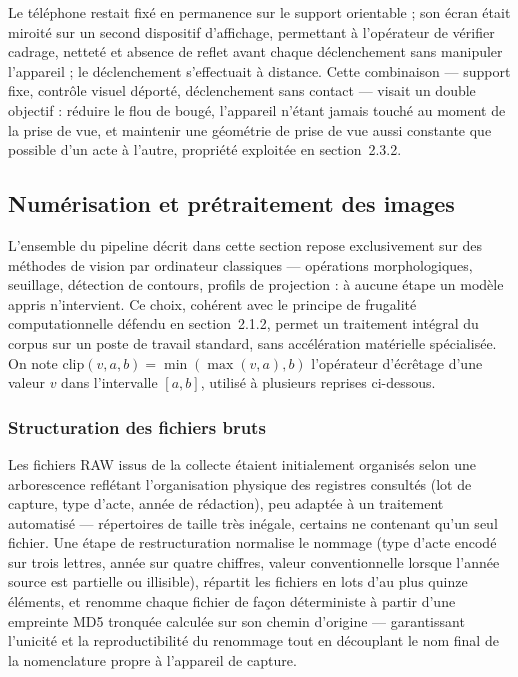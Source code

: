 Le téléphone restait fixé en permanence sur le support orientable ; son écran était miroité sur un second dispositif d'affichage, permettant à l'opérateur de vérifier cadrage, netteté et absence de reflet avant chaque déclenchement sans manipuler l'appareil ; le déclenchement s'effectuait à distance.
Cette combinaison --- support fixe, contrôle visuel déporté, déclenchement sans contact --- visait un double objectif : réduire le flou de bougé, l'appareil n'étant jamais touché au moment de la prise de vue, et maintenir une géométrie de prise de vue aussi constante que possible d'un acte à l'autre, propriété exploitée en section~2.3.2.

\subsection{Numérisation et prétraitement des images}

L'ensemble du pipeline décrit dans cette section repose exclusivement sur des méthodes de vision par ordinateur classiques --- opérations morphologiques, seuillage, détection de contours, profils de projection : à aucune étape un modèle appris n'intervient.
Ce choix, cohérent avec le principe de frugalité computationnelle défendu en section~2.1.2, permet un traitement intégral du corpus sur un poste de travail standard, sans accélération matérielle spécialisée.
On note $\mathrm{clip}(v,a,b) = \min(\max(v,a),b)$ l'opérateur d'écrêtage d'une valeur $v$ dans l'intervalle $[a,b]$, utilisé à plusieurs reprises ci-dessous.

\subsubsection*{Structuration des fichiers bruts}

Les fichiers RAW issus de la collecte étaient initialement organisés selon une arborescence reflétant l'organisation physique des registres consultés (lot de capture, type d'acte, année de rédaction), peu adaptée à un traitement automatisé --- répertoires de taille très inégale, certains ne contenant qu'un seul fichier.
Une étape de restructuration normalise le nommage (type d'acte encodé sur trois lettres, année sur quatre chiffres, valeur conventionnelle lorsque l'année source est partielle ou illisible), répartit les fichiers en lots d'au plus quinze éléments, et renomme chaque fichier de façon déterministe à partir d'une empreinte MD5 tronquée calculée sur son chemin d'origine --- garantissant l'unicité et la reproductibilité du renommage tout en découplant le nom final de la nomenclature propre à l'appareil de capture.

